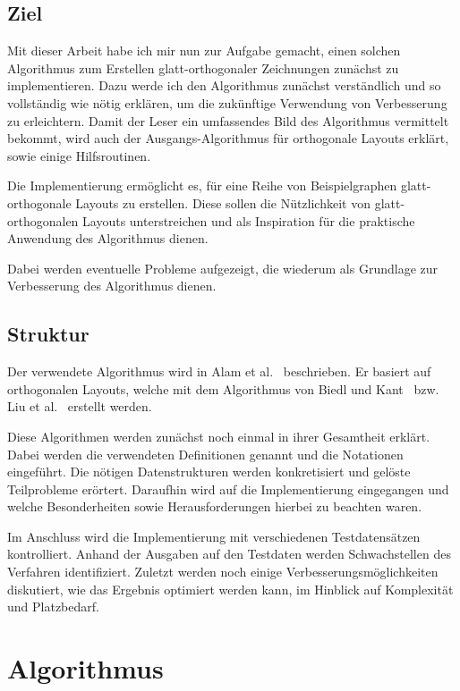 \documentclass[a4paper]{scrreprt}
\theoremstyle{definition}
\newcommand{\go}{glatt-or\-tho\-go\-nal}
\begin{document}
\section{Ziel}

Mit dieser Arbeit habe ich mir nun zur Aufgabe gemacht, einen solchen Algorithmus zum Erstellen glatt-orthogonaler Zeichnungen zunächst zu implementieren. Dazu werde ich den Algorithmus zunächst verständlich und so vollständig wie nötig erklären, um die zukünftige Verwendung von Verbesserung zu erleichtern. Damit der Leser ein umfassendes Bild des Algorithmus vermittelt bekommt, wird auch der Ausgangs-Algorithmus für orthogonale Layouts erklärt, sowie einige Hilfsroutinen. 

Die Implementierung ermöglicht es, für eine Reihe von Beispielgraphen \go e Layouts zu erstellen. Diese sollen die Nützlichkeit von glatt-orthogonalen Layouts unterstreichen und als Inspiration für die praktische Anwendung des Algorithmus dienen.

Dabei werden eventuelle Probleme aufgezeigt, die wiederum als Grundlage zur Verbesserung des Algorithmus dienen. 

\section{Struktur}


Der verwendete Algorithmus wird in Alam et al.~\cite{smooth-13} beschrieben. Er basiert auf orthogonalen
Layouts, welche mit dem Algorithmus von Biedl und Kant~\cite{biedl+kant-98} bzw. Liu et al.~\cite{liu+etal-98} erstellt
werden.

Diese Algorithmen werden zunächst noch einmal in ihrer Gesamtheit erklärt. Dabei werden die
verwendeten Definitionen genannt und die Notationen eingeführt. Die nötigen Datenstrukturen
werden konkretisiert und gelöste Teilprobleme erörtert. Daraufhin wird auf die Implementierung eingegangen und welche Besonderheiten sowie Herausforderungen hierbei zu
beachten waren. 

Im Anschluss wird die Implementierung mit verschiedenen Testdatensätzen kontrolliert. Anhand
der Ausgaben auf den Testdaten werden Schwachstellen des Verfahren identifiziert. 
Zuletzt werden noch einige Verbesserungsmöglichkeiten diskutiert, wie das Ergebnis
optimiert werden kann, im Hinblick auf Komplexität und Platzbedarf.


\chapter{Algorithmus}
\end{document}
